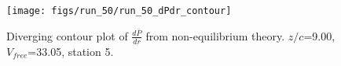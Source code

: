 \begin{figure}[H]
\centering
\texttt{[image: figs/run\_50/run\_50\_dPdr\_contour]}
\caption{Diverging contour plot of $\frac{d\bar{P}}{dr}$ from non-equilibrium theory. $z/c$=9.00, $V_{free}$=33.05, station 5.}
\label{fig:run_50_dPdr_contour}
\end{figure}


